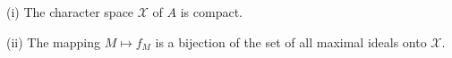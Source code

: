 (i) The character space $\mathcal{X}$ of $A$ is compact.

(ii) The mapping $M \mapsto f_M$ is a bijection of the set of all maximal ideals onto $\mathcal{X}$.
